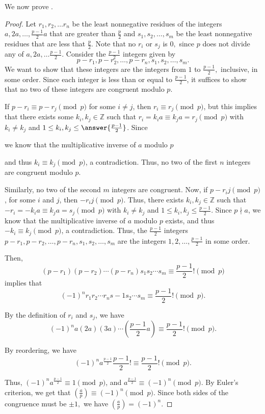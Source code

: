 \documentclass{ximera}
\begin{document}
We now prove .


\begin{proof}
 	Let $r_1,r_2,\dots r_n$ be the least nonnegative residues of the integers $a,2a,\dots,\frac{p-1}{2}a$ that are greater than $\frac{p}{2}$ and $s_1,s_2,\dots,s_m$ be the least nonnegative residues that are less that $\frac{p}{2}$. Note that no $r_i$ or $s_j$ is $0,$ since $p$ does not divide any of $a,2a,\dots \frac{p-1}{2}$. Consider the $\frac{p-1}{2}$ integers given by 
		\[p-r_1,p-r_2,\dots,p-r_n,s_1,s_2,\dots,s_m.\]
 	We want to show that these integers are the integers from $1$ to $\frac{p-1}{2},$ inclusive, in some order. Since each integer is less than or equal to $\frac{p-1}{2}$, it suffices to show that no two of these integers are congruent modulo $p$. 
 
	If $p-r_i\equiv p-r_j \pmod p$ for some $i\neq j$, then $r_i\equiv r_j \pmod p$, but this implies that there exists some $k_i,k_j\in\mathbb{Z}$ such that $r_i=k_ia\equiv k_ja=r_j\pmod p$ with $k_i\neq k_j$ and $1\leq k_i,k_j\leq\answer{\frac{p-1}{2}}
	$. Since 
	\begin{multipleChoice}
	\end{multipleChoice}
 	we know that the multiplicative inverse of $a$ modulo $p$ 
	\begin{multipleChoice}
 		\choice[correct] {exists}
 		\choice {does not exist}
	\end{multipleChoice}
 	and thus $k_i\equiv k_j \pmod p$, a contradiction. Thus, no two of the first $n$ integers are congruent modulo $p$. 
 
 	Similarly, no two of the second $m$ integers are congruent. Now, if $p-r_ij \pmod p$, for some $i$ and $j$, then $-r_ij \pmod p$. Thus, there exists $k_i,k_j\in\mathbb{Z}$ such that $-r_i=-k_ia\equiv k_ja=s_j\pmod p$ with $k_i\neq k_j$ and $1\leq k_i,k_j\leq\frac{p-1}{2}$. Since $p\nmid a$, we know that the multiplicative inverse of $a$ modulo $p$ exists, and thus $-k_i\equiv k_j \pmod p$, a contradiction.
	Thus, the $\frac{p-1}{2}$ integers $p-r_1,p-r_2,\dots,p-r_n,s_1,s_2,\dots,s_m$ are the integers $1,2,\dots,\frac{p-1}{2}$ in some order. 

	Then, 
		\[
			(p-r_1)(p-r_2)\cdots(p-r_n)s_1s_2\cdots s_m
			\equiv\frac{p-1}{2}! \pmod p
		\]
	implies that  
		\[
			(-1)^nr_1r_2\cdots r_ns-1s_2\cdots s_m
			\equiv\frac{p-1}{2}! \pmod p. 
		\]
	
	By the definition of $r_i$ and $s_j$, we have 
		\[
			(-1)^na(2a)(3a)\cdots(\frac{p-1}{2}a)
			\equiv\frac{p-1}{2}! \pmod p. 
		\]
	
	By reordering, we have 
		\[
			(-1)^na^{\frac{p-1}{2}}\frac{p-1}{2}!\equiv\frac{p-1}{2}! \pmod p. 
		\]
	
	Thus, $(-1)^na^{\frac{p-1}{2}}\equiv 1 \pmod p$, and $a^{\frac{p-1}{2}}\equiv (-1)^n \pmod p$. By Euler's criterion, we get that $\left(\frac{a}{p}\right)\equiv(-1)^n \pmod p$. Since both sides of the congruence must be $\pm1,$ we have $\left(\frac{a}{p}\right)=(-1)^n $.
\end{proof}
\end{document}
